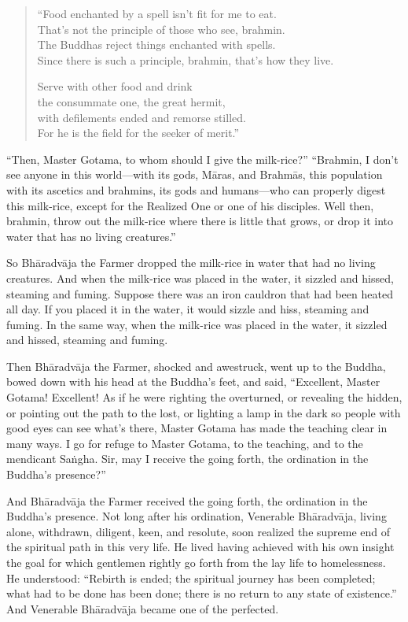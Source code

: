\documentclass[12pt,openany]{book}%
\begin{document}
\begin{verse}%
“Food enchanted by a spell isn’t fit for me to eat. \\
That’s not the principle of those who see, brahmin. \\
The Buddhas reject things enchanted with spells. \\
Since there is such a principle, brahmin, that’s how they live. 

Serve with other food and drink \\
the consummate one, the great hermit, \\
with defilements ended and remorse stilled. \\
For he is the field for the seeker of merit.” 

%
\end{verse}

“Then, Master Gotama, to whom should I give the milk-rice?” “Brahmin, I don’t see anyone in this world—with its gods, \textsanskrit{Māras}, and \textsanskrit{Brahmās}, this population with its ascetics and brahmins, its gods and humans—who can properly digest this milk-rice, except for the Realized One or one of his disciples. Well then, brahmin, throw out the milk-rice where there is little that grows, or drop it into water that has no living creatures.” 

So \textsanskrit{Bhāradvāja} the Farmer dropped the milk-rice in water that had no living creatures. And when the milk-rice was placed in the water, it sizzled and hissed, steaming and fuming. Suppose there was an iron cauldron that had been heated all day. If you placed it in the water, it would sizzle and hiss, steaming and fuming. In the same way, when the milk-rice was placed in the water, it sizzled and hissed, steaming and fuming. 

Then \textsanskrit{Bhāradvāja} the Farmer, shocked and awestruck,  went up to the Buddha, bowed down with his head at the Buddha’s feet, and said, “Excellent, Master Gotama! Excellent! As if he were righting the overturned, or revealing the hidden, or pointing out the path to the lost, or lighting a lamp in the dark so people with good eyes can see what’s there, Master Gotama has made the teaching clear in many ways. I go for refuge to Master Gotama, to the teaching, and to the mendicant \textsanskrit{Saṅgha}. Sir, may I receive the going forth, the ordination in the Buddha’s presence?” 

And \textsanskrit{Bhāradvāja} the Farmer received the going forth, the ordination in the Buddha’s presence. Not long after his ordination, Venerable \textsanskrit{Bhāradvāja}, living alone, withdrawn, diligent, keen, and resolute, soon realized the supreme end of the spiritual path in this very life. He lived having achieved with his own insight the goal for which gentlemen rightly go forth from the lay life to homelessness. He understood: “Rebirth is ended; the spiritual journey has been completed; what had to be done has been done; there is no return to any state of existence.” And Venerable \textsanskrit{Bhāradvāja} became one of the perfected. 
\end{document}
